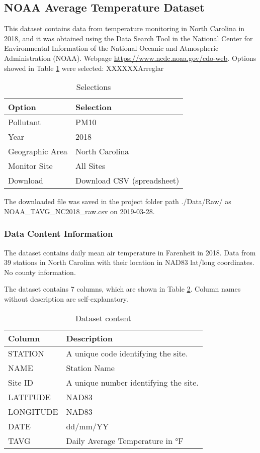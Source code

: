 \documentclass[12pt,]{article}
\begin{document}
\subsection{NOAA Average Temperature
Dataset}\label{noaa-average-temperature-dataset}

This dataset contains data from temperature monitoring in North Carolina
in 2018, and it was obtained using the Data Search Tool in the National
Center for Environmental Information of the National Oceanic and
Atmospheric Administration (NOAA). Webpage
\url{https://www.ncdc.noaa.gov/cdo-web}. Options showed in Table
\ref{tab:tab6} were selected: XXXXXXArreglar

\begin{table}[ht]
\centering
\begin{tabular}{ll}
  \hline
Option & Selection \\ 
  \hline
Pollutant & PM10 \\ 
  Year & 2018 \\ 
  Geographic Area & North Carolina \\ 
  Monitor Site & All Sites \\ 
  Download & Download CSV (spreadsheet) \\ 
   \hline
\end{tabular}
\caption{Selections} 
\label{tab:tab6}
\end{table}

The downloaded file was saved in the project folder path ./Data/Raw/ as
NOAA\_TAVG\_NC2018\_raw.csv on 2019-03-28.

\subsubsection{Data Content
Information}\label{data-content-information-2}

The dataset contains daily mean air temperature in Farenheit in 2018.
Data from 39 stations in North Carolina with their location in NAD83
lat/long coordinates. No county information.

The dataset contains 7 columns, which are shown in Table \ref{tab:tab7}.
Column names without description are self-explanatory.

\begin{table}[ht]
\centering
\begin{tabular}{p{2.5in}p{3.5in}}
  \hline
Column & Description \\ 
  \hline
STATION & A unique code identifying the site. \\ 
  NAME & Station Name \\ 
  Site ID & A unique number identifying the site. \\ 
  LATITUDE & NAD83 \\ 
  LONGITUDE & NAD83 \\ 
  DATE & dd/mm/YY \\ 
  TAVG & Daily Average Temperature in °F \\ 
   \hline
\end{tabular}
\caption{Dataset content} 
\label{tab:tab7}
\end{table}
\end{document}
